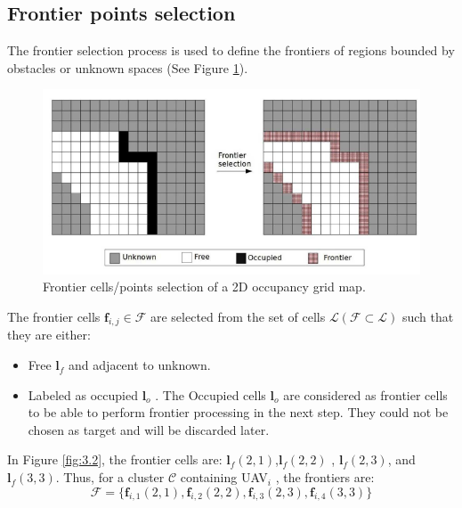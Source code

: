 \documentclass[11pt,openany]{book}
\begin{document}
\subsection{Frontier points selection}
The frontier selection process is used to deﬁne the frontiers of regions bounded by obstacles or unknown spaces (See Figure \ref{fig:3.3}).
\begin{figure}[H]
    \centering
    \includegraphics[scale=0.4]{assets/3_3.png}
    \caption{Frontier cells/points selection of a 2D occupancy grid map.}
    \label{fig:3.3}
\end{figure}
The frontier cells $\mathbf{f}_{i,j} \in \mathcal{F}$ are selected from the set of cells $\mathcal{L}(\mathcal{F}\subset \mathcal{L})$ such that they are either:
\begin{itemize}
    \item Free $\mathbf{l}_f$ and adjacent to unknown.
    \item Labeled as occupied $\mathbf{l}_o$ . The Occupied cells $\mathbf{l}_o$ are considered as frontier cells to be able to perform frontier processing in the next step. They could not be chosen as target and will be discarded later.
\end{itemize}
In Figure \ref{fig:3.2}, the frontier cells are: $\mathbf{l}_f(2,1)$,$\mathbf{l}_f(2,2)$ , $\mathbf{l}_f(2,3)$, and $\mathbf{l}_f(3,3)$. Thus, for a cluster $\mathcal{C}$ containing UAV$_i$ , the frontiers are:
\begin{equation} \label{eq:3.1}
    \mathcal{F}=\{\mathbf{f}_{i,1}(2,1),\mathbf{f}_{i,2}(2,2),\mathbf{f}_{i,3}(2,3),\mathbf{f}_{i,4}(3,3)\}
\end{equation}
\end{document}
